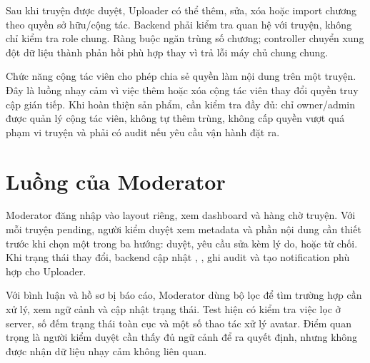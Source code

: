 Sau khi truyện được duyệt, Uploader có thể thêm, sửa, xóa hoặc import chương theo quyền sở hữu/cộng tác. Backend phải kiểm tra quan hệ với truyện, không chỉ kiểm tra role chung. Ràng buộc  ngăn trùng số chương; controller chuyển xung đột dữ liệu thành phản hồi phù hợp thay vì trả lỗi máy chủ chung chung.

Chức năng cộng tác viên cho phép chia sẻ quyền làm nội dung trên một truyện. Đây là luồng nhạy cảm vì việc thêm hoặc xóa cộng tác viên thay đổi quyền truy cập gián tiếp. Khi hoàn thiện sản phẩm, cần kiểm tra đầy đủ: chỉ owner/admin được quản lý cộng tác viên, không tự thêm trùng, không cấp quyền vượt quá phạm vi truyện và phải có audit nếu yêu cầu vận hành đặt ra.
\clearpage
\section{Luồng của Moderator}

Moderator đăng nhập vào layout riêng, xem dashboard và hàng chờ truyện. Với mỗi truyện pending, người kiểm duyệt xem metadata và phần nội dung cần thiết trước khi chọn một trong ba hướng: duyệt, yêu cầu sửa kèm lý do, hoặc từ chối. Khi trạng thái thay đổi, backend cập nhật , , ghi audit và tạo notification phù hợp cho Uploader.

Với bình luận và hồ sơ bị báo cáo, Moderator dùng bộ lọc để tìm trường hợp cần xử lý, xem ngữ cảnh và cập nhật trạng thái. Test hiện có kiểm tra việc lọc ở server, số đếm trạng thái toàn cục và một số thao tác xử lý avatar. Điểm quan trọng là người kiểm duyệt cần thấy đủ ngữ cảnh để ra quyết định, nhưng không được nhận dữ liệu nhạy cảm không liên quan.

